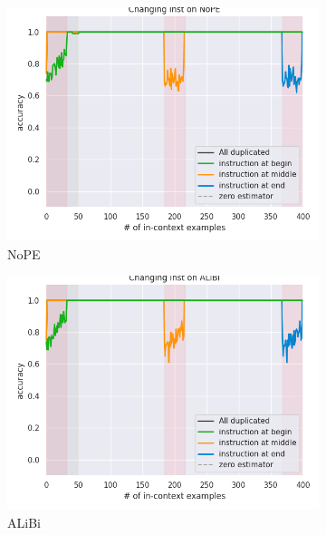 \documentclass[letterpaper]{article} %
\begin{document}
\begin{figure}[htbp]
    \centering
    \begin{subfigure}[b]{0.23\textwidth}
        \includegraphics[width=\textwidth]{AnonymousSubmission/LaTeX/imgs/appendix/nope_inst.png}
        \caption{NoPE}
    \end{subfigure}
    \begin{subfigure}[b]{0.23\textwidth}
        \includegraphics[width=\textwidth]{AnonymousSubmission/LaTeX/imgs/appendix/alibi_inst.png}
        \caption{ALiBi}
    \end{subfigure}
    \begin{subfigure}[b]{0.23\textwidth}

\end{subfigure}
\end{figure}
\end{document}
